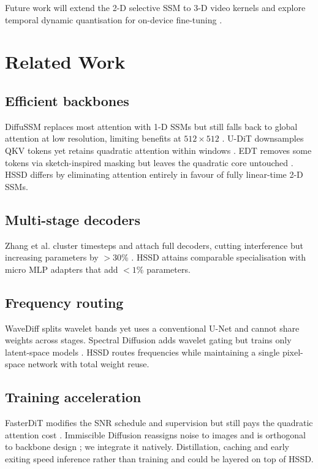\documentclass{article}
\begin{document}
Future work will extend the 2-D selective SSM to 3-D video kernels and explore temporal dynamic quantisation for on-device fine-tuning \cite{so-2023-temporal}.

\section{Related Work}
\subsection{Efficient backbones}
DiffuSSM replaces most attention with 1-D SSMs but still falls back to global attention at low resolution, limiting benefits at $512 \times 512$ \cite{yan-2023-diffusion}. U-DiT downsamples QKV tokens yet retains quadratic attention within windows \cite{tian-2024-dits}. EDT removes some tokens via sketch-inspired masking but leaves the quadratic core untouched \cite{chen-2024-edt}. HSSD differs by eliminating attention entirely in favour of fully linear-time 2-D SSMs.

\subsection{Multi-stage decoders}
Zhang et al. cluster timesteps and attach full decoders, cutting interference but increasing parameters by $>30$\% \cite{zhang-2023-improving}. HSSD attains comparable specialisation with micro MLP adapters that add $<1$\% parameters.

\subsection{Frequency routing}
WaveDiff splits wavelet bands yet uses a conventional U-Net and cannot share weights across stages. Spectral Diffusion adds wavelet gating but trains only latent-space models \cite{yang-2022-diffusion}. HSSD routes frequencies while maintaining a single pixel-space network with total weight reuse.

\subsection{Training acceleration}
FasterDiT modifies the SNR schedule and supervision but still pays the quadratic attention cost \cite{yao-2024-fasterdit}. Immiscible Diffusion reassigns noise to images and is orthogonal to backbone design \cite{li-2024-immiscible}; we integrate it natively. Distillation, caching and early exiting speed inference rather than training \cite{salimans-2024-multistep,ma-2024-learning,moon-2024-simple} and could be layered on top of HSSD.
\end{document}

